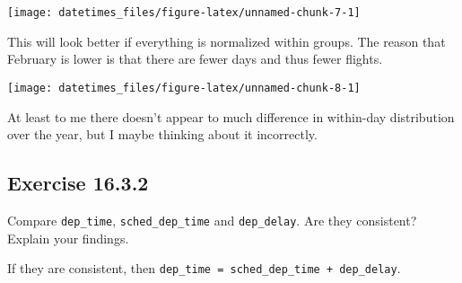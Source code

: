 \documentclass[]{book}
\newenvironment{Shaded}{\begin{snugshade}}{\end{snugshade}}
\newcommand{\DataTypeTok}[1]{\textcolor[rgb]{0.13,0.29,0.53}{#1}}
\newcommand{\DecValTok}[1]{\textcolor[rgb]{0.00,0.00,0.81}{#1}}
\newcommand{\KeywordTok}[1]{\textcolor[rgb]{0.13,0.29,0.53}{\textbf{#1}}}
\newcommand{\NormalTok}[1]{#1}
\newcommand{\OperatorTok}[1]{\textcolor[rgb]{0.81,0.36,0.00}{\textbf{#1}}}
\newcommand{\StringTok}[1]{\textcolor[rgb]{0.31,0.60,0.02}{#1}}
\theoremstyle{plain}
\theoremstyle{remark}
\begin{document}
\begin{center}\texttt{[image: datetimes\_files/figure-latex/unnamed-chunk-7-1]} \end{center}

This will look better if everything is normalized within groups. The
reason that February is lower is that there are fewer days and thus
fewer flights.

\begin{Shaded}
\end{Shaded}

\begin{center}\texttt{[image: datetimes\_files/figure-latex/unnamed-chunk-8-1]} \end{center}

At least to me there doesn't appear to much difference in within-day
distribution over the year, but I maybe thinking about it incorrectly.

\hypertarget{exercise-16.3.2}{%
\subsection*{\texorpdfstring{Exercise
{16.3.2}}{Exercise 16.3.2}}\label{exercise-16.3.2}}

Compare \texttt{dep\_time}, \texttt{sched\_dep\_time} and
\texttt{dep\_delay}. Are they consistent? Explain your findings.

If they are consistent, then
\texttt{dep\_time\ =\ sched\_dep\_time\ +\ dep\_delay}.
\end{document}

